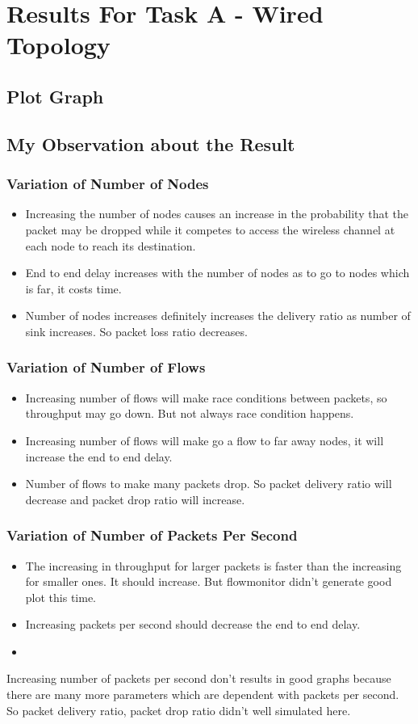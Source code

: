 \documentclass[12pt, a4paper]{article}
\begin{document}
\section{Results For Task A - Wired Topology}
\subsection{Plot Graph}

\subsection{My Observation about the Result}
\subsubsection{Variation of Number of Nodes}
\begin{itemize}
    \item Increasing the number of nodes causes an increase in the probability that the packet may be dropped while it competes to access the wireless channel at each node to reach its destination.
    \item End to end delay increases with the number of nodes as to go to nodes which is far, it costs time.
    \item Number of nodes increases definitely increases the delivery ratio as number of sink increases. So packet loss ratio decreases.
\end{itemize}
\subsubsection{Variation of Number of Flows}
\begin{itemize}
    \item Increasing number of flows will make race conditions between packets, so throughput may go down. But not always race condition happens.
    \item Increasing number of flows will make go a flow to far away nodes, it will increase the end to end delay.
    \item Number of flows to make many packets drop. So packet delivery ratio will decrease and packet drop ratio will increase.
\end{itemize}
\subsubsection{Variation of Number of Packets Per Second}
\begin{itemize}
    \item The increasing in throughput for larger packets is faster than the increasing for smaller ones. It should increase. But flowmonitor didn't generate good plot this time.
    \item Increasing packets per second should decrease the end to end delay.
    \item 
\end{itemize}Increasing number of packets per second don't results in good graphs because there are many more parameters which are dependent with packets per second. So packet delivery ratio, packet drop ratio didn't well simulated here.
\end{document}
